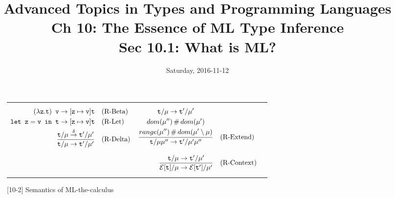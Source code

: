 \documentclass{amsart}
\title{Advanced Topics in Types and Programming Languages\\
    Ch 10: The Essence of ML Type Inference\\Sec 10.1: What is ML?}
\date{Saturday, 2016-11-12}
\begin{document}
\maketitle

\def\dto{\overset{\delta}{\to}}

\newlength{\colwid}
\setlength{\colwid}{0.5\textwidth}

\newcommand{\p}{$^\prime$}

\newlength{\oldjot}
\setlength{\oldjot}{\jot}
\begin{figure}[h]
  \begin{tabular}{p{\colwid}|p{\colwid}}
    {\begin{minipage}{\colwid}
      \setlength{\jot}{1em}
      \begin{align*}
        (\lambda \mono{z}.\mono{t}) \mono{ v} \to [\mono{z} \mapsto
            \mono{v}]\mono{t}& & &\textup{(R-Beta)} \\
        \mono{let z} = \mono{v in t} \to [\mono{z} \mapsto
            \mono{v}]\mono{t}& & &\textup{(R-Let)} \\
        \frac{\mono{t}/\mu \dto \mono{t}'/\mu'}{\mono{t}/\mu \to
            \mono{t}'/\mu'}& & &\textup{(R-Delta)}
      \end{align*}
    \end{minipage}}
    &
    {\begin{minipage}{\colwid}
      \begin{align*}
      \frac{
          \begin{gathered}
            \texttt{t}/\mu \to \texttt{t}'/\mu' \\
            dom(\mu'') \operatorname{\#} dom(\mu') \\
            range(\mu'') \operatorname{\#} dom(\mu'\setminus\mu)
          \end{gathered}
        }{\texttt{t}/\mu\mu'' \to \texttt{t}'/\mu'\mu''}&
        & &\textup{(R-Extend)} \\[1em]
      \frac{\texttt{t}/\mu \to \texttt{t}'/\mu'}
          {\mathcal{E}[\texttt{t}]/\mu \to
          \mathcal{E}[\texttt{t}']/\mu'}& & &\textup{(R-Context)}
    \end{align*} \end{minipage}}
  \end{tabular}
  \caption{[10-2] Semantics of ML-the-calculus}
\end{figure}
\end{document}
